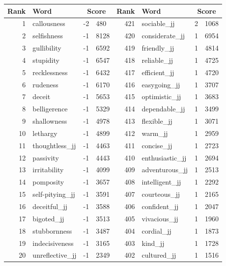 \begin{table}[tbp]
    \begin{tabular}{| rlr@{.}l | rlr@{.}l |}
    \hline
    \textbf{Rank} & \textbf{Word} & \multicolumn{2}{c|}{\textbf{Score}} & \textbf{Rank} & \textbf{Word} & \multicolumn{2}{c|}{\textbf{Score}} \\
    \hline
    1 & callousness & -2 & 480    &    421 & sociable\_jj & 2 & 1068 \\
    2 & selfishness & -1 & 8128    &    420 & considerate\_jj & 1 & 6954 \\
    3 & gullibility & -1 & 6592    &    419 & friendly\_jj & 1 & 4814 \\
    4 & stupidity & -1 & 6547    &    418 & reliable\_jj & 1 & 4725 \\
    5 & recklessness & -1 & 6432    &    417 & efficient\_jj & 1 & 4720 \\
    6 & rudeness & -1 & 6170    &    416 & easygoing\_jj & 1 & 3707 \\
    7 & deceit & -1 & 5653    &    415 & optimistic\_jj & 1 & 3683 \\
    8 & belligerence & -1 & 5329    &    414 & dependable\_jj & 1 & 3499 \\
    9 & shallowness & -1 & 4978    &    413 & flexible\_jj & 1 & 3071 \\
    10 & lethargy & -1 & 4899    &    412 & warm\_jj & 1 & 2959 \\
    11 & thoughtless\_jj & -1 & 4463    &    411 & concise\_jj & 1 & 2723 \\
    12 & passivity & -1 & 4443    &    410 & enthusiastic\_jj & 1 & 2694 \\
    13 & irritability & -1 & 4099    &    409 & adventurous\_jj & 1 & 2513 \\
    14 & pomposity & -1 & 3657    &    408 & intelligent\_jj & 1 & 2292 \\
    15 & self-pitying\_jj & -1 & 3591    &    407 & courteous\_jj & 1 & 2165 \\
    16 & deceitful\_jj & -1 & 3588    &    406 & confident\_jj & 1 & 2047 \\
    17 & bigoted\_jj & -1 & 3513    &    405 & vivacious\_jj & 1 & 1960 \\
    18 & stubbornness & -1 & 3487    &    404 & cordial\_jj & 1 & 1873 \\
    19 & indecisiveness & -1 & 3165    &    403 & kind\_jj & 1 & 1728 \\
    20 & unreflective\_jj & -1 & 2349    &    402 & cultured\_jj & 1 & 1516 \\

\end{tabular}
\end{table}
